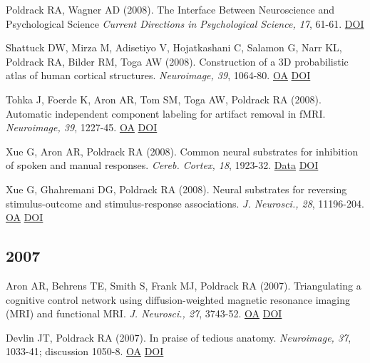 Poldrack RA, Wagner AD (2008). The Interface Between Neuroscience and Psychological Science \textit{Current Directions in Psychological Science, 17}, 61-61. \href{http://dx.doi.org/10.1111/j.1467-8721.2008.00549.x}{DOI} \vspace{2mm}

Shattuck DW, Mirza M, Adisetiyo V, Hojatkashani C, Salamon G, Narr KL, Poldrack RA, Bilder RM, Toga AW (2008). Construction of a 3D probabilistic atlas of human cortical structures. \textit{Neuroimage, 39}, 1064-80. \href{https://www.ncbi.nlm.nih.gov/pmc/articles/PMC2757616}{OA} \href{http://dx.doi.org/10.1016/j.neuroimage.2007.09.031}{DOI} \vspace{2mm}

Tohka J, Foerde K, Aron AR, Tom SM, Toga AW, Poldrack RA (2008). Automatic independent component labeling for artifact removal in fMRI. \textit{Neuroimage, 39}, 1227-45. \href{https://www.ncbi.nlm.nih.gov/pmc/articles/PMC2374836}{OA} \href{http://dx.doi.org/10.1016/j.neuroimage.2007.10.013}{DOI} \vspace{2mm}

Xue G, Aron AR, Poldrack RA (2008). Common neural substrates for inhibition of spoken and manual responses. \textit{Cereb. Cortex, 18}, 1923-32. \href{https://openneuro.org/datasets/ds000007/versions/00001}{Data} \href{http://dx.doi.org/10.1093/cercor/bhm220}{DOI} \vspace{2mm}

Xue G, Ghahremani DG, Poldrack RA (2008). Neural substrates for reversing stimulus-outcome and stimulus-response associations. \textit{J. Neurosci., 28}, 11196-204. \href{https://www.ncbi.nlm.nih.gov/pmc/articles/PMC6671509}{OA} \href{http://dx.doi.org/10.1523/jneurosci.4001-08.2008}{DOI} \vspace{2mm}

\subsection*{2007}

Aron AR, Behrens TE, Smith S, Frank MJ, Poldrack RA (2007). Triangulating a cognitive control network using diffusion-weighted magnetic resonance imaging (MRI) and functional MRI. \textit{J. Neurosci., 27}, 3743-52. \href{https://www.ncbi.nlm.nih.gov/pmc/articles/PMC6672420}{OA} \href{http://dx.doi.org/10.1523/jneurosci.0519-07.2007}{DOI} \vspace{2mm}

Devlin JT, Poldrack RA (2007). In praise of tedious anatomy. \textit{Neuroimage, 37}, 1033-41; discussion 1050-8. \href{https://www.ncbi.nlm.nih.gov/pmc/articles/PMC1986635}{OA} \href{http://dx.doi.org/10.1016/j.neuroimage.2006.09.055}{DOI} \vspace{2mm}

